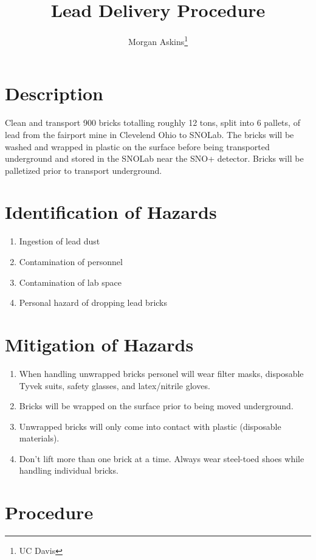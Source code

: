 \documentclass{article}
\title{Lead Delivery Procedure}
\author{Morgan Askins\thanks{UC Davis}}
\date{}
\begin{document}
\maketitle
\section*{Description}
Clean and transport 900 bricks totalling roughly 12 tons, split into 6 pallets, of lead from the fairport mine in Clevelend Ohio to SNOLab. The bricks will be washed and wrapped in plastic on the surface before being transported underground and stored in the SNOLab near the SNO+ detector. Bricks will be palletized prior to transport underground.
\section*{Identification of Hazards}
\begin{enumerate}
  \item Ingestion of lead dust
  \item Contamination of personnel
  \item Contamination of lab space
  \item Personal hazard of dropping lead bricks
\end{enumerate}
\section*{Mitigation of Hazards}
\begin{enumerate}
  \item When handling unwrapped bricks personel will wear filter masks, disposable Tyvek suits, safety glasses, and latex/nitrile gloves. 
  \item Bricks will be wrapped on the surface prior to being moved underground.
  \item Unwrapped bricks will only come into contact with plastic (disposable materials).
  \item Don't lift more than one brick at a time. Always wear steel-toed shoes while handling individual bricks.
\end{enumerate}
\section*{Procedure}
\end{document}
